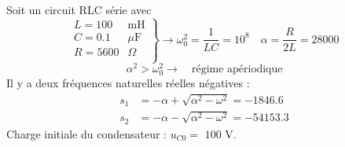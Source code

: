 \begin{testexample}
Soit un circuit RLC série avec 
\[\left.\begin{array}{rl}
L=100 & \text{mH}\\
C=0.1 & \mu\text{F}\\
R=5600 & \Omega\\
\end{array}\right\}
\rightarrow \omega_0^2=\frac{1}{LC}=10^8 \quad \alpha=\frac{R}{2L}=28000
\]
\[\alpha^2 > \omega_0^2 \rightarrow \quad \text{régime apériodique}\]
Il y a deux fréquences naturelles réelles négatives :
\begin{align*}
s_1 &=-\alpha + \sqrt{\alpha^2-\omega^2}=-1846.6\\
s_2 &=-\alpha - \sqrt{\alpha^2-\omega^2}=-54153.3
\end{align*}
Charge initiale du condensateur : $u_{C0}=$ $100$ V.


\end{testexample}
